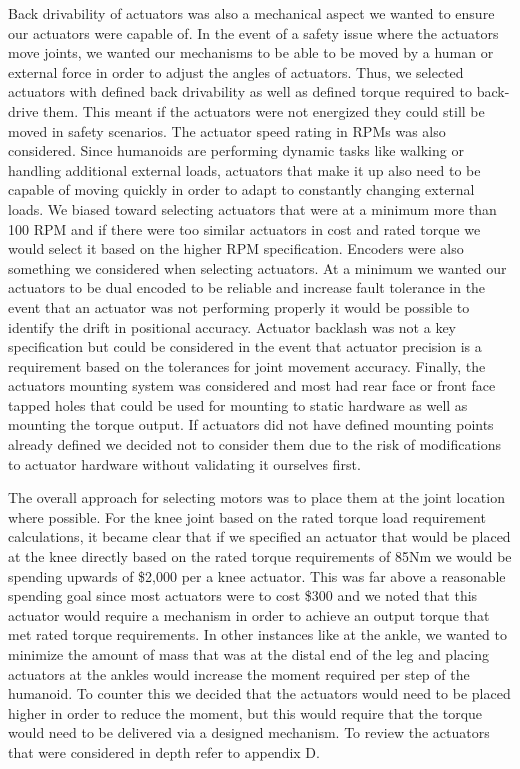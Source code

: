 \documentclass{article}
\begin{document}
Back drivability of actuators was also a mechanical aspect we wanted to ensure our actuators were capable of. In the event of a safety issue where the actuators move joints, we wanted our mechanisms to be able to be moved by a human or external force in order to adjust the angles of actuators. Thus, we selected actuators with defined back drivability as well as defined torque required to back-drive them. This meant if the actuators were not energized they could still be moved in safety scenarios. The actuator speed rating in RPMs was also considered. Since humanoids are performing dynamic tasks like walking or handling additional external loads, actuators that make it up also need to be capable of moving quickly in order to adapt to constantly changing external loads. We biased toward selecting actuators that were at a minimum more than 100 RPM and if there were too similar actuators in cost and rated torque we would select it based on the higher RPM specification. Encoders were also something we considered when selecting actuators. At a minimum we wanted our actuators to be dual encoded to be reliable and increase fault tolerance in the event that an actuator was not performing properly it would be possible to identify the drift in positional accuracy. Actuator backlash was not a key specification but could be considered in the event that actuator precision is a requirement based on the tolerances for joint movement accuracy. Finally, the actuators mounting system was considered and most had rear face or front face tapped holes that could be used for mounting to static hardware as well as mounting the torque output. If actuators did not have defined mounting points already defined we decided not to consider them due to the risk of modifications to actuator hardware without validating it ourselves first. 

The overall approach for selecting motors was to place them at the joint location where possible. For the knee joint based on the rated torque load requirement calculations, it became clear that if we specified an actuator that would be placed at the knee directly based on the rated torque requirements of 85Nm we would be spending upwards of \$2,000 per a knee actuator. This was far above a reasonable spending goal since most actuators were to cost \$300 and we noted that this actuator would require a mechanism in order to achieve an output torque that met rated torque requirements. In other instances like at the ankle, we wanted to minimize the amount of mass that was at the distal end of the leg and placing actuators at the ankles would increase the moment required per step of the humanoid. To counter this we decided that the actuators would need to be placed higher in order to reduce the moment, but this would require that the torque would need to be delivered via a designed mechanism. To review the actuators that were considered in depth refer to appendix D. 
\end{document}
